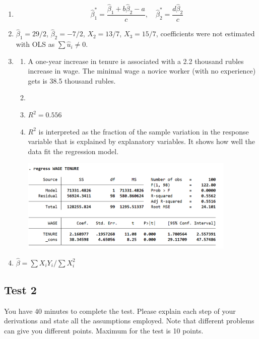 \begin{enumerate}
    \item 
\[
\hat\beta_1^* = \frac{\hat\beta_1 + b \hat\beta_2 -a}{c}, \quad \hat\beta_2^* = \frac{d\hat\beta_2}{c}
\]
\item $\hat\beta_1 = 29/2$, $\hat\beta_2 = -7/2$, $X_2 = 13/7$, $X_3 = 15/7$, 
coefficients were not estimated with OLS as $\sum \hat u_i \neq 0$.
\item 
\begin{enumerate}
    \item A one-year increase in tenure is associated with a 2.2 thousand rubles increase in wage.
    The minimal wage a novice worker (with no experience) gets is 38.5 thousand rubles.
 \item 
 \item $R^2 = 0.556$
 \item $R^2$ is interpreted as the fraction of the sample variation in the response variable that
 is explained by explanatory variables. It shows how well the data ﬁt the regression
 model.

\begin{minipage}{\textwidth}
    \includegraphics[width=0.85\textwidth]{figures/2021-2022_tests_stata-c.png}
\end{minipage}

\end{enumerate}
\item $\hat\beta = \sum X_i Y_i / \sum X_i^2$
\end{enumerate}

\subsection{Test 2}

You have 40 minutes to complete the test. Please explain each step of your derivations and state
all the assumptions employed. Note that different problems can give you different points.
Maximum for the test is 10 points.


